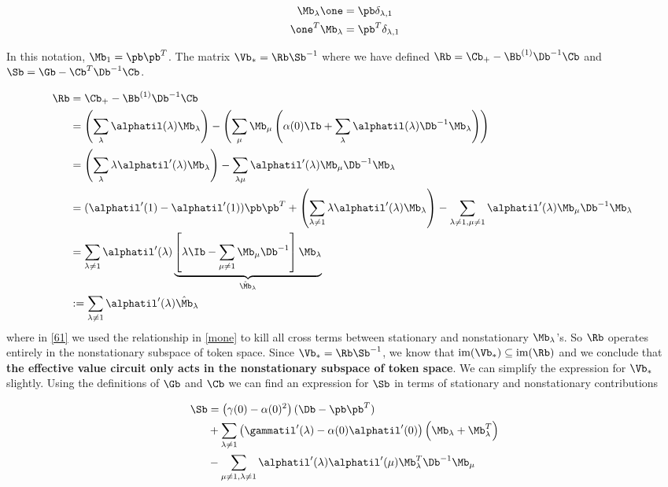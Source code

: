\documentclass{article}
\begin{document}
\begin{align}\label{mone}
    \Mb_\lambda \one &= \pb \delta_{\lambda,1} \\
    \one^T \Mb_\lambda &= \pb^T \delta_{\lambda,1}
\end{align}

In this notation, $\Mb_1 = \pb \pb^T$.
The matrix $\Vb_* = \Rb \Sb^{-1}$ where we have defined $\Rb = \Cb_+ - \Bb^{(1)}\Db^{-1}\Cb$ and $\Sb = \Gb - \Cb^T \Db^{-1}\Cb$. 

\begin{align}
    \Rb &= \Cb_+ - \Bb^{(1)}\Db^{-1}\Cb \\
    &= \left(\sum_\lambda \alphatil(\lambda) \Mb_\lambda\right) - \left(\sum_\mu \Mb_\mu \left(\alpha(0)\Ib + \sum_\lambda \alphatil(\lambda)\Db^{-1} \Mb_\lambda\right) \right) \\
    &= \left(\sum_\lambda \lambda\alphatil'(\lambda)\Mb_\lambda\right) - \sum_{\lambda\mu}\alphatil'(\lambda)\Mb_\mu\Db^{-1}\Mb_\lambda\ \\
    &= (\alphatil'(1) - \alphatil'(1))\pb \pb^T + \left(\sum_{\lambda \neq 1}\lambda\alphatil'(\lambda)\Mb_\lambda\right) - \sum_{\lambda\neq 1, \mu\neq 1}\alphatil'(\lambda)\Mb_\mu\Db^{-1}\Mb_\lambda\ \label{61} \\
    &= \sum_{\lambda \neq 1}\alphatil'(\lambda) \underbrace{\left [ \lambda \Ib - \sum_{\mu\neq 1}\Mb_\mu \Db^{-1}\right]\Mb_\lambda}_{\hat{\Mb}_\lambda} \\
    &:=  \sum_{\lambda \neq 1}\alphatil'(\lambda) \hat{\Mb}_\lambda
\end{align}
 where in \eqref{61} we used the relationship in \eqref{mone} to kill all cross terms between stationary and nonstationary $\Mb_\lambda$'s. So $\Rb$ operates entirely in the nonstationary subspace of token space. Since $\Vb_* = \Rb \Sb^{-1}$, we know that $\textrm{im}(\Vb_*) \subseteq \textrm{im}(\Rb)$ and we conclude that \textbf{the effective value circuit only acts in the nonstationary subspace of token space}. We can simplify the expression for $\Vb_*$ slightly. Using the definitions of $\Gb$ and $\Cb$ we can find an expression for $\Sb$ in terms of stationary and nonstationary contributions

 \begin{align*}
     \Sb &= \left(\gamma(0) - \alpha(0)^2\right)(\Db - \pb\pb^T)\\
     &+ \sum_{\lambda \neq 1}\left( \gammatil'(\lambda) - \alpha(0)\alphatil'(0)\right ) \left( \Mb_\lambda + \Mb_\lambda^T\right) \\
     &- \sum_{\mu\neq 1, \lambda\neq 1} \alphatil'(\lambda)\alphatil'(\mu)\Mb_\lambda^T \Db^{-1}\Mb_\mu
 \end{align*}
\end{document}
